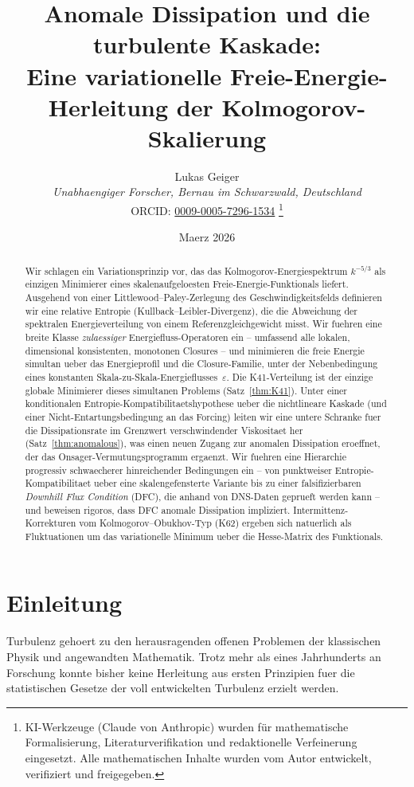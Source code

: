 \documentclass[12pt,a4paper]{article}
\title{Anomale Dissipation und die turbulente Kaskade:\\
Eine variationelle Freie-Energie-Herleitung der Kolmogorov-Skalierung}
\author{Lukas Geiger\\
\textit{Unabhaengiger Forscher, Bernau im Schwarzwald, Deutschland}\\
ORCID: \href{https://orcid.org/0009-0005-7296-1534}{0009-0005-7296-1534}%
\thanks{KI-Werkzeuge (Claude von Anthropic) wurden für mathematische Formalisierung, Literaturverifikation und redaktionelle Verfeinerung eingesetzt. Alle mathematischen Inhalte wurden vom Autor entwickelt, verifiziert und freigegeben.}}
\date{Maerz 2026}
\theoremstyle{definition}
\theoremstyle{plain}
\theoremstyle{remark}
\begin{document}
\maketitle

\begin{abstract}
Wir schlagen ein Variationsprinzip vor, das das Kolmogorov-Energiespektrum
$k^{-5/3}$ als einzigen Minimierer eines skalenaufgeloesten
Freie-Energie-Funktionals liefert. Ausgehend von einer
Littlewood--Paley-Zerlegung des Geschwindigkeitsfelds definieren wir eine
relative Entropie (Kullback--Leibler-Divergenz), die die Abweichung der
spektralen Energieverteilung von einem Referenzgleichgewicht misst. Wir
fuehren eine breite Klasse \emph{zulaessiger} Energiefluss-Operatoren ein
-- umfassend alle lokalen, dimensional konsistenten, monotonen Closures --
und minimieren die freie Energie simultan ueber das Energieprofil und die
Closure-Familie, unter der Nebenbedingung eines konstanten
Skala-zu-Skala-Energieflusses~$\varepsilon$. Die K41-Verteilung ist der
einzige globale Minimierer dieses simultanen Problems
(Satz~\ref{thm:K41}). Unter einer konditionalen
Entropie-Kompatibilitaetshypothese ueber die nichtlineare Kaskade (und
einer Nicht-Entartungsbedingung an das Forcing) leiten wir eine untere
Schranke fuer die Dissipationsrate im Grenzwert verschwindender Viskositaet
her (Satz~\ref{thm:anomalous}), was einen neuen Zugang zur anomalen
Dissipation eroeffnet, der das Onsager-Vermutungsprogramm ergaenzt.
Wir fuehren eine Hierarchie progressiv schwaecherer hinreichender
Bedingungen ein -- von punktweiser Entropie-Kompatibilitaet ueber eine
skalengefensterte Variante bis zu einer falsifizierbaren
\emph{Downhill Flux Condition} (DFC), die anhand von DNS-Daten geprueft
werden kann -- und beweisen rigoros, dass DFC anomale Dissipation
impliziert.
Intermittenz-Korrekturen vom Kolmogorov--Obukhov-Typ (K62) ergeben sich
natuerlich als Fluktuationen um das variationelle Minimum ueber die
Hesse-Matrix des Funktionals.
\end{abstract}

\section{Einleitung}\label{sec:intro}

Turbulenz gehoert zu den herausragenden offenen Problemen der klassischen
Physik und angewandten Mathematik. Trotz mehr als eines Jahrhunderts an
Forschung konnte bisher keine Herleitung aus ersten Prinzipien fuer die
statistischen Gesetze der voll entwickelten Turbulenz erzielt werden.
\end{document}
